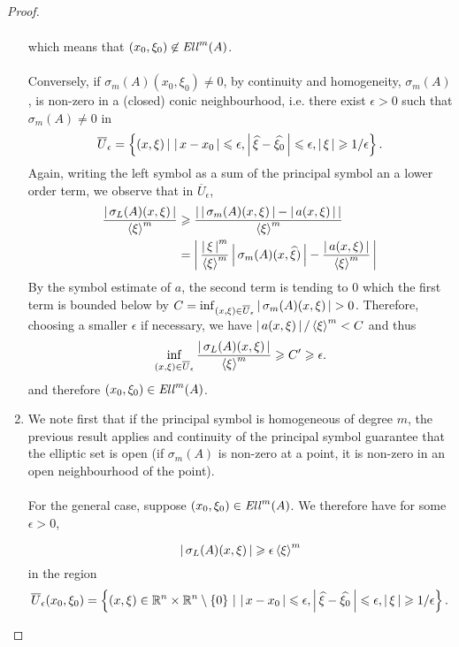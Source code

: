 \documentclass[12pt]{article}
\begin{document}
\begin{proof}
\begin{enumerate}
\begin{align*}
        \end{align*}
        which means that $(x_0, \xi_0) \not \in \Ell^m(A)$. \\
        \\
        Conversely, if $\sigma_m(A)(x_0, \xi_0) \neq 0$, by continuity and homogeneity,  $\sigma_m(A)$, is non-zero in a (closed) conic neighbourhood, i.e. there exist $\epsilon > 0$ such that $\sigma_m(A) \neq 0$ in 
        \begin{align*}
        \overline{U}_\epsilon = \set{(x, \xi) \wh \abs{x - x_0} \leq \epsilon, \abs{\widehat{\xi} - \widehat{\xi_0}}\leq \epsilon, \abs{\xi} \geq 1/ \epsilon}. 
        \end{align*}
        Again, writing the left symbol as a sum of the principal symbol an a lower order term, we observe that in $\overline{U}_\epsilon$, 
        \begin{align*}
        \frac{\abs{\sigma_L(A)(x, \xi)} }{\sym[\xi]^m}
        & \geq \frac{\abs{\abs{\sigma_m(A)(x, \xi)} - \abs{a(x, \xi)}}}{\sym[\xi]^m} \\
        & = \abs{\frac{\abs{\xi}^m}{\sym[\xi]^m} \abs{\sigma_m(A)(x, \widehat{\xi})} - \frac{\abs{a(x, \xi)}}{\sym[\xi]^m}} \\
        \end{align*}
        By the symbol estimate of $a$, the second term is tending to $0$ which the first term is bounded below by $C = \inf_{(x, \xi) \in \overline{U}_\epsilon} \abs{\sigma_m(A)(x, \xi)} > 0$. Therefore, choosing a smaller $\epsilon$ if necessary, we have $\abs{a(x, \xi)} / \sym[\xi]^m < C$ and thus 
        \begin{align*}
        \inf_{(x, \xi) \in \overline{U}_\epsilon} \frac{\abs{\sigma_L(A)(x, \xi)} }{\sym[\xi]^m}
        \geq C' 
        \geq \epsilon. 
        \end{align*}
        and therefore $(x_0, \xi_0) \in \Ell^m(A)$. 
        
        \item We note first that if the principal symbol is homogeneous of degree $m$, the previous result applies and continuity of the principal symbol guarantee that the elliptic set is open (if $\sigma_m(A)$ is non-zero at a point, it is non-zero in an open neighbourhood of the point). \\
        \\
        For the general case, suppose $(x_0, \xi_0) \in \Ell^m(A)$. We therefore have for some $\epsilon > 0$, 
        
         \[
        \abs{\sigma_L(A)(x, \xi)} \geq \epsilon \sym[\xi]^m
        \]
        in the region
        \[
        \overline{U}_\epsilon(x_0, \xi_0) = \set{(x, \xi) \in \R^n \times \R^n \setminus \set{0} \wh \abs{x - x_0} \leq \epsilon, \abs{\widehat{\xi} - \widehat{\xi_0}} \leq \epsilon, \abs{\xi} \geq 1/\epsilon}. 
        \]
        

\end{enumerate}
\end{proof}
\end{document}
